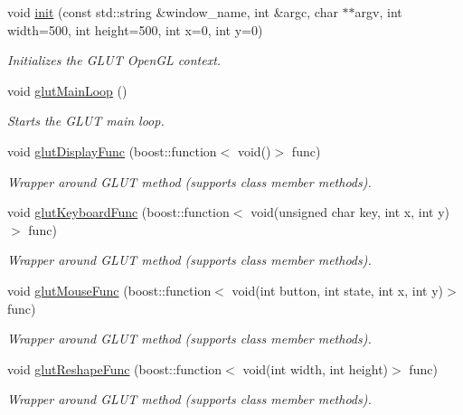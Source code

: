 \begin{CompactItemize}
\item 
void \hyperlink{namespace_pg_g_l_u_t_95723231de4f81fc9e6596a7f60f0811}{init} (const std::string \&window\_\-name, int \&argc, char $\ast$$\ast$argv, int width=500, int height=500, int x=0, int y=0)
\begin{CompactList}\small\item\em Initializes the GLUT OpenGL context. \item\end{CompactList}\item 
void \hyperlink{namespace_pg_g_l_u_t_161a4c69d2edbcd21fee91d128a3ef54}{glutMainLoop} ()
\begin{CompactList}\small\item\em Starts the GLUT main loop. \item\end{CompactList}\item 
void \hyperlink{namespace_pg_g_l_u_t_fc9d60400e5bf6641d101f320c9019b6}{glutDisplayFunc} (boost::function$<$ void()$>$ func)
\begin{CompactList}\small\item\em Wrapper around GLUT method (supports class member methods). \item\end{CompactList}\item 
void \hyperlink{namespace_pg_g_l_u_t_de5fa3bf06d851c9de6cf23052710fde}{glutKeyboardFunc} (boost::function$<$ void(unsigned char key, int x, int y)$>$ func)
\begin{CompactList}\small\item\em Wrapper around GLUT method (supports class member methods). \item\end{CompactList}\item 
void \hyperlink{namespace_pg_g_l_u_t_2226e9d474845b2fcfdd75bf5ab78ff3}{glutMouseFunc} (boost::function$<$ void(int button, int state, int x, int y)$>$ func)
\begin{CompactList}\small\item\em Wrapper around GLUT method (supports class member methods). \item\end{CompactList}\item 
void \hyperlink{namespace_pg_g_l_u_t_a22fdd9d50c60d0261be08fc9ae23c8b}{glutReshapeFunc} (boost::function$<$ void(int width, int height)$>$ func)
\begin{CompactList}\small\item\em Wrapper around GLUT method (supports class member methods). \item\end{CompactList}\end{CompactItemize}
